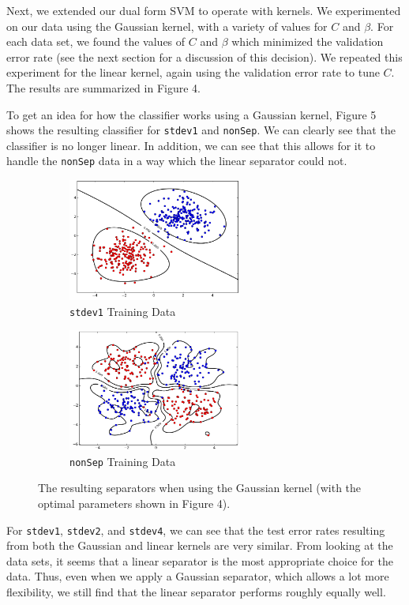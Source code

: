 \documentclass{sigchi}
\begin{document}
Next, we extended our dual form SVM to operate with kernels. We experimented on our data using the Gaussian kernel, with a variety of values for $C$ and $\beta$. For each data set, we found the values of $C$ and $\beta$ which minimized the validation error rate (see the next section for a discussion of this decision). We repeated this experiment for the linear kernel, again using the validation error rate to tune $C$. The results are summarized in Figure 4.


To get an idea for how the classifier works using a Gaussian kernel, Figure 5 shows the resulting classifier for \texttt{stdev1} and \texttt{nonSep}. We can clearly see that the classifier is no longer linear. In addition, we can see that this allows for it to handle the \texttt{nonSep} data in a way which the linear separator could not.

\begin{figure}
\centering

\begin{subfigure}[b]{2.25in}
	\includegraphics[width = 2.25in]{plots/1-3/casey/nonSepguass2.png}
	\caption{\texttt{stdev1} Training Data}
\end{subfigure}

\begin{subfigure}[b]{2.25in}
	\includegraphics[width = 2.25in]{plots/1-3/casey/nonSepgauss.png}
	\caption{\texttt{nonSep} Training Data}
\end{subfigure}
\caption{The resulting separators when using the Gaussian kernel (with the optimal parameters shown in Figure 4).}
\end{figure}

For \texttt{stdev1}, \texttt{stdev2}, and \texttt{stdev4}, we can see that the test error rates resulting from both the Gaussian and linear kernels are very similar. From looking at the data sets, it seems that a linear separator is the most appropriate choice for the data. Thus, even when we apply a Gaussian separator, which allows a lot more flexibility, we still find that the linear separator performs roughly equally well.
\end{document}

